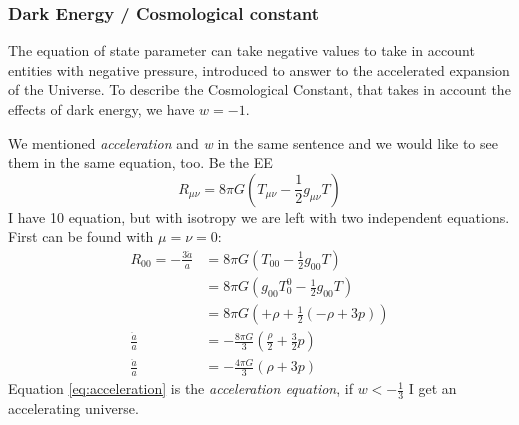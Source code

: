 \subsubsection{Dark Energy / Cosmological constant}
The equation of state parameter can take negative values to take in account entities with negative pressure, introduced to answer to the accelerated expansion of the Universe. To describe the Cosmological Constant, that takes in account the effects of dark energy, we have  $w = -1$. \par
We mentioned \emph{acceleration} and \emph{w} in the same sentence and we would like to see them in the same equation, too. Be the EE
\[
R_{\mu \nu } = 8\pi G\left( T_{\mu \nu }-\frac{1}{2}g_{\mu \nu }T \right)
\]
I have 10 equation, but with isotropy we are left with two independent equations.
First can be found with $\mu  = \nu  = 0$:
\begin{align}
	R_{00} = - \frac{3 \ddot{a}}{a} &= 8\pi G \left( T_{00}-\frac{1}{2}g_{00}T \right) \nonumber\\
					&= 8\pi G \left( g_{00}T^{0}_{0}-\frac{1}{2}g_{00}T \right) \nonumber\\
					&= 8\pi G \left( +\rho  +\frac{1}{2}\left( -\rho +3p \right) \right) \nonumber\\
	\frac{\ddot{a}}{a} &= - \frac{8\pi G}{3} \left( \frac{\rho }{2} + \frac{3}{2}p \right) \nonumber\\
	\frac{\ddot{a}}{a}&= - \frac{4\pi G}{3}\left( \rho +3p \right) \label{eq:acceleration}
\end{align}
Equation \ref{eq:acceleration} is the \emph{acceleration equation}, if $w < -\frac{1}{3}$ I get an accelerating universe.\par

